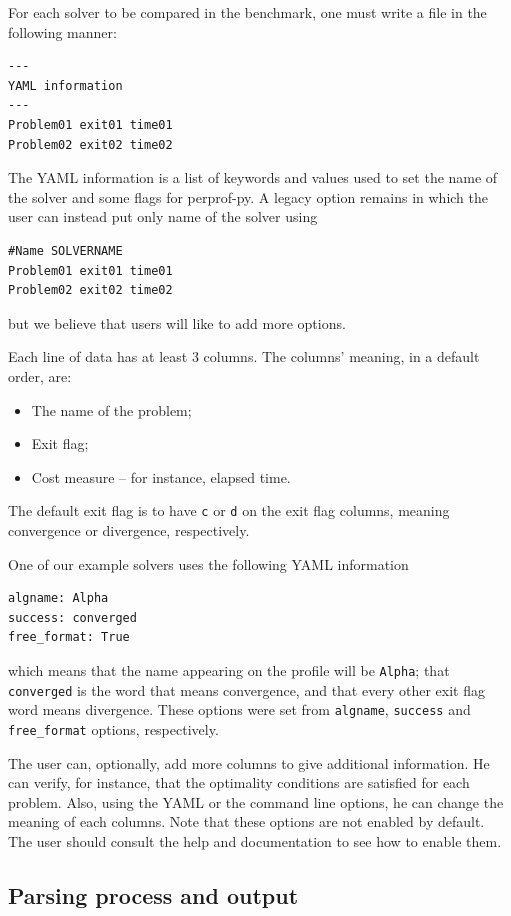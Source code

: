     For each solver to be compared in the benchmark, one must write a file in
    the following manner:

    \begin{verbatim}
---
YAML information
---
Problem01 exit01 time01
Problem02 exit02 time02
    \end{verbatim}

    The YAML\cite{url:yaml,url:pyyaml} information is a list of keywords and values used to
    set the name of the solver and some
    flags for perprof-py.
    A legacy option remains in which the user can instead put only name of the
    solver using
\begin{verbatim}
#Name SOLVERNAME
Problem01 exit01 time01
Problem02 exit02 time02
\end{verbatim}
    but we believe that users will like to add more options.

    Each line of data has at least 3 columns.
    The columns' meaning, in a default order, are:
    \begin{itemize}
      \item The name of the problem;
      \item Exit flag;
      \item Cost measure -- for instance, elapsed time.
    \end{itemize}
    The default exit flag is to have {\tt c} or {\tt d} on the exit flag
    columns, meaning convergence or divergence, respectively.

    One of our example solvers uses the following YAML information
\begin{verbatim}
algname: Alpha
success: converged
free_format: True
\end{verbatim}
    which means that the name appearing on the profile will be {\tt Alpha};
    that {\tt converged} is the word that means convergence,
    and that every other exit flag word means divergence.
    These options were set from {\tt algname}, {\tt success} and {\tt
    free\_format} options, respectively.

    The user can, optionally, add more columns to give additional information.
    He can verify, for instance, that the optimality conditions are satisfied
    for each problem.
    Also, using the YAML or the command line options, he can change the
    meaning of each columns.
    Note that these options are not enabled by default. The user should consult
    the help and documentation to see how to enable them.

\subsection*{Parsing process and output}

